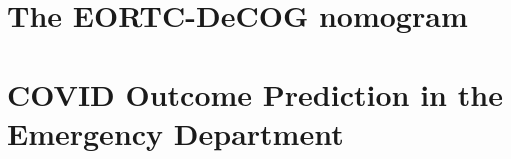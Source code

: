 \documentclass[
]{book}
\begin{document}
\vspace*{\fill}\par
\pagebreak

\hypertarget{the-eortc-decog-nomogram}{%
\chapter{The EORTC-DeCOG nomogram}\label{the-eortc-decog-nomogram}}

\vspace*{\fill}\par
\pagebreak

\lipsum[1-4]

\hypertarget{covid-outcome-prediction-in-the-emergency-department}{%
\chapter{COVID Outcome Prediction in the Emergency Department}\label{covid-outcome-prediction-in-the-emergency-department}}

\vspace*{\fill}\par
\pagebreak

\lipsum[1-4]
\end{document}
